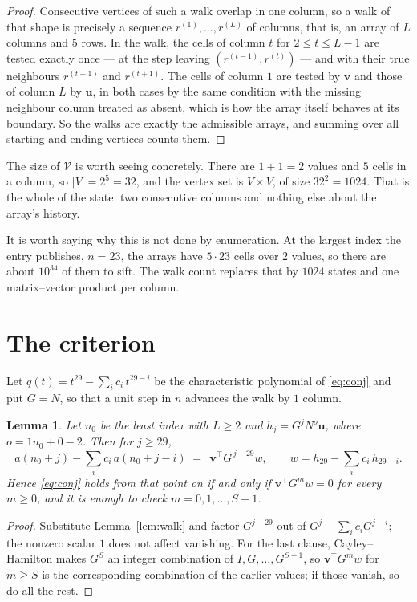 \documentclass[11pt,a4paper]{article}
\theoremstyle{plain}
\newtheorem{lemma}[theorem]{Lemma}
\theoremstyle{definition}
\begin{document}
\begin{proof}
Consecutive vertices of such a walk overlap in one column, so a walk of that shape is
precisely a sequence $r^{(1)},\dots,r^{(L)}$ of columns, that is, an array of $L$ columns
and $5$ rows. In the walk, the cells of column $t$ for $2\le t\le L-1$ are tested
exactly once --- at the step leaving $(r^{(t-1)},r^{(t)})$ --- and with their true
neighbours $r^{(t-1)}$ and $r^{(t+1)}$. The cells of column $1$ are tested by
$\mathbf{v}$ and those of column $L$ by $\mathbf{u}$, in both cases by the same condition
with the missing neighbour column treated as absent, which is how the array itself behaves at
its boundary. So the walks are exactly the admissible arrays, and summing over all starting
and ending vertices counts them.
\end{proof}


The size of $\mathcal V$ is worth seeing concretely. There are $1+1=2$ values
and $5$ cells in a column, so $|V|=2^{5}=32$, and the vertex set is
$V\times V$, of size $32^2=1024$. That is the whole of the state: two consecutive
columns and nothing else about the array's history.

It is worth saying why this is not done by enumeration. At the largest index the entry
publishes, $n=23$, the arrays have $5\cdot23$ cells over
$2$ values, so there are about $10^{34}$ of them to sift. The
walk count replaces that by $1024$ states and one matrix--vector product per column.
\section{The criterion}

Let $q(t)=t^{29}-\sum_i c_i\,t^{29-i}$ be the characteristic polynomial of
\eqref{eq:conj} and put $G=N$, so that a unit step in $n$ advances the walk by
$1$ column.

\begin{lemma}\label{lem:crit}
Let $n_0$ be the least index with $L\ge2$ and $h_j=G^{j}N^{o}\mathbf{u}$, where
$o=1n_0+0-2$. Then for $j\ge29$,
\[
a(n_0+j)-\sum_i c_i\,a(n_0+j-i)\;=\;\,\mathbf{v}^{\!\top}G^{\,j-29}w,
\qquad w=h_{29}-\sum_i c_i\,h_{29-i} .
\]
Hence \eqref{eq:conj} holds from that point on if and only if
$\mathbf{v}^{\!\top}G^{m}w=0$ for every $m\ge0$, and it is enough to check
$m=0,1,\dots,S-1$.
\end{lemma}

\begin{proof}
Substitute Lemma~\ref{lem:walk} and factor $G^{j-29}$ out of
$G^{j}-\sum_ic_iG^{j-i}$; the nonzero scalar $1$ does not affect
vanishing. For the last clause, Cayley--Hamilton makes $G^{S}$ an integer combination of
$I,G,\dots,G^{S-1}$, so $\mathbf{v}^{\!\top}G^{m}w$ for $m\ge S$ is the corresponding
combination of the earlier values; if those vanish, so do all the rest.
\end{proof}
\end{document}
